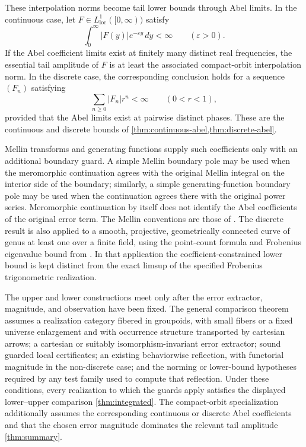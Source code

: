 \documentclass[12pt,a4paper,twoside]{extarticle}
\theoremstyle{compactplain}
\theoremstyle{compactdef}
\begin{document}
These interpolation norms become tail lower bounds through Abel limits.  In
the continuous case, let \(F\in L^1_{\mathrm{loc}}([0,\infty))\) satisfy
\[
  \int_0^\infty |F(y)|e^{-\varepsilon y}\,dy<\infty
  \qquad(\varepsilon>0).
\]
If the Abel coefficient limits exist at finitely many distinct real
frequencies, the essential tail amplitude of \(F\) is at least the associated
compact-orbit interpolation norm.  In the discrete case, the corresponding
conclusion holds for a sequence \((F_n)\) satisfying
\[
  \sum_{n\geq0}|F_n|r^n<\infty
  \qquad(0<r<1),
\]
provided that the Abel limits exist at pairwise distinct phases.  These are
the continuous and discrete bounds of
\cref{thm:continuous-abel,thm:discrete-abel}.

Mellin transforms and generating functions supply such coefficients only with
an additional boundary guard.  A simple Mellin boundary pole may be used when
the meromorphic continuation agrees with the original Mellin integral on the
interior side of the boundary; similarly, a simple generating-function
boundary pole may be used when the continuation agrees there with the original
power series.  Meromorphic continuation by itself does not identify the Abel
coefficients of the original error term.  The Mellin conventions are those of
\cite{zagier}.  The discrete result is also applied to a smooth, projective,
geometrically connected curve of genus at least one over a finite field,
using the point-count formula and Frobenius eigenvalue bound from
\cite{weil,deligne}.  In that application the coefficient-constrained lower
bound is kept distinct from the exact limsup of the specified Frobenius
trigonometric realization.

The upper and lower constructions meet only after the error extractor,
magnitude, and observation have been fixed.  The general comparison theorem
assumes a realization category fibered in groupoids, with small fibers or a
fixed universe enlargement and with occurrence structure transported by
cartesian arrows; a cartesian or suitably isomorphism-invariant error
extractor; sound guarded local certificates; an existing behaviorwise
reflection, with functorial magnitude in the non-discrete case; and the
norming or lower-bound hypotheses required by any test family used to compute
that reflection.  Under these conditions, every realization to which the
guards apply satisfies the displayed lower--upper comparison
\cref{thm:integrated}.  The compact-orbit specialization additionally assumes
the corresponding continuous or discrete Abel coefficients and that the
chosen error magnitude dominates the relevant tail amplitude
\cref{thm:summary}.
\end{document}

